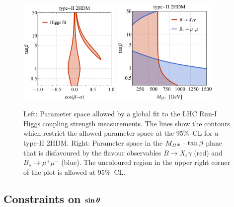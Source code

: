 \documentclass[a4paper, 11pt,notoc]{article}
\def\bm#1{\mbox{\boldmath$#1$\unboldmath}}
\begin{document}
\begin{figure}[t!]
\centering
\includegraphics[width=0.435\textwidth]{figure3l.pdf} \qquad 
\includegraphics[width=0.45\textwidth]{figure3r.pdf}
\vspace{4mm}
\caption{\label{fig:higgsflavourfit} Left: Parameter space allowed by a global fit to the LHC Run-I Higgs coupling strength measurements.  The lines show the contours which restrict the allowed parameter space at the 95\%~CL for a type-II 2HDM. Right: Parameter space in the $M_{H^\pm}\hspace{0.5mm}$--$\hspace{0.5mm}\tan \beta$ plane that is disfavoured by the flavour observables $B \to X_s \gamma$ (red) and $B_s \to \mu^+ \mu^-$ (blue). The uncoloured region in the upper right corner of the plot is allowed at 95\%~CL. }
\end{figure}

\subsection*{Constraints on $\bm{\sin \theta}$}
\end{document}
